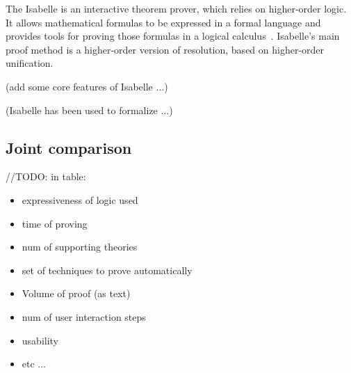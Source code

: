 \documentclass[article]{aaltoseries}
\begin{document}
The Isabelle is an interactive theorem prover, which relies on higher-order logic. It allows mathematical formulas to be expressed in a formal language and provides tools for proving those formulas in a logical calculus~\cite{tool_Isabelle}. Isabelle's main proof method is a higher-order version of resolution, based on higher-order unification.

(add some core features of Isabelle ...)

(Isabelle has been used to formalize ...)



\subsection{Joint comparison}
\label{sec:joint_comparison}

//TODO: in table:
\begin{itemize}
	\itemsep0em
	\item expressiveness of logic used
	\item time of proving
	\item num of supporting theories
	\item set of techniques to prove automatically
	\item Volume of proof (as text)
	\item num of user interaction steps
	\item usability
	\item etc ...
\end{itemize}
\end{document}
